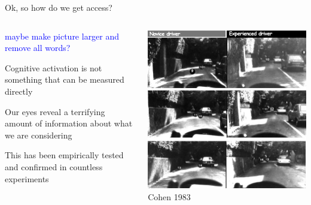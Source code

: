 \documentclass{beamer}
\providecommand{\cn}[1]{\textcolor{blue}{#1}}
\begin{document}
\begin{frame}{Ok, so how do we get access?}

\begin{columns}
\begin{column}{0.45\textwidth}

\cn{maybe make picture larger and remove all words?}

Cognitive activation is not something that can be measured directly \vspace{4mm}

Our eyes reveal a terrifying amount of information about what we are considering \vspace{4mm}

This has been empirically tested and confirmed in countless experiments
\end{column}
\begin{column}{0.5\textwidth}
\begin{center}
\includegraphics[scale=0.45]{img/car_eye.jpg}
{\tiny Cohen 1983}
\end{center}
\end{column}
\end{columns}

\end{frame}
\end{document}
